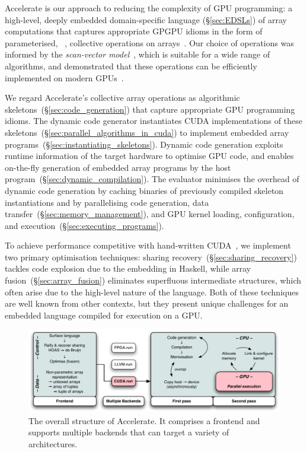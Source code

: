 Accelerate is our approach to reducing the complexity of GPU programming: a
high-level, deeply embedded domain-specific language (\S\ref{sec:EDSLs}) of
array computations that captures appropriate GPGPU idioms in the form of
parameterised, ~\cite{Keller:2010er}, collective
operations on arrays~\cite{Chakravarty:2011fr}. Our choice of operations was
informed by the \emph{scan-vector model}~\cite{Chatterjee:1990vj}, which is
suitable for a wide range of algorithms, and demonstrated that these operations
can be efficiently implemented on modern GPUs~\cite{Sengupta:2007tc}.

We regard Accelerate's collective array operations as algorithmic
skeletons~(\S\ref{sec:code_generation}) that capture appropriate GPU programming
idioms. The dynamic code generator instantiates CUDA implementations of these
skeletons~(\S\ref{sec:parallel_algorithms_in_cuda}) to implement embedded array
programs~(\S\ref{sec:instantiating_skeletons}). Dynamic code generation exploits
runtime information of the target hardware to optimise GPU code, and enables
on-the-fly generation of embedded array programs by the host
program~(\S\ref{sec:dynamic_compilation}). The evaluator minimises the overhead
of dynamic code generation by caching binaries of previously compiled skeleton
instantiations and by parallelising code generation, data
transfer~(\S\ref{sec:memory_management}), and GPU kernel loading, configuration,
and execution~(\S\ref{sec:executing_programs}).

To achieve performance competitive with hand-written
CUDA~\cite{McDonell:2013wi}, we implement two primary optimisation techniques:
sharing recovery~(\S\ref{sec:sharing_recovery}) tackles code explosion due to
the embedding in Haskell, while array
fusion~(\S\ref{sec:array_fusion}) eliminates superfluous
intermediate structures, which often arise due to the high-level nature of the
language. Both of these techniques are well known from other contexts, but they
present unique challenges for an embedded language compiled for execution on a
GPU.

\begin{figure}
    \centering
    \includegraphics[width=\textwidth]{images/acc/outline-s}
    \caption[The overall structure of Accelerate]{The overall structure of
    Accelerate. It comprises a frontend and supports multiple backends that can
    target a variety of architectures.}
    \label{fig:outline}
\end{figure}

